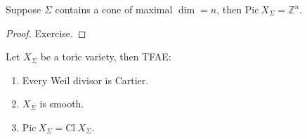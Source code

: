 \documentclass[a4paper,12pt]{amsart}
\newcommand{\ZZ}{\mathbb{Z}}
\begin{document}
\begin{proposition}
	Suppose $\Sigma$ contains a cone of maximal $\dim=n$, then $\mathrm{Pic}~X_\Sigma=\ZZ^n$. 
\end{proposition}
\begin{proof}
	Exercise.
\end{proof}

\begin{theorem}
	Let $X_\Sigma$ be a toric variety, then TFAE:
	\begin{enumerate}
		\item Every Weil divisor is Cartier.
		\item $X_\Sigma$ is smooth.
		\item $\mathrm{Pic}~X_\Sigma=\mathrm{Cl}~X_\Sigma$.
	\end{enumerate}
\end{theorem}
\end{document}
